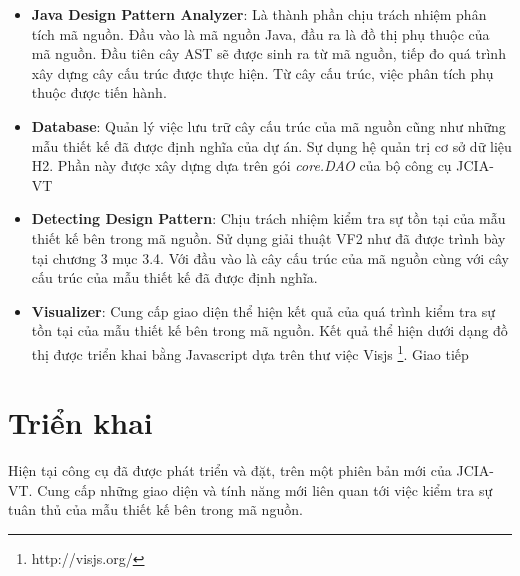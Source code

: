 \documentclass[12pt]{report}
\begin{document}
\begin{itemize}
	\item \noindent \textbf{Java Design Pattern Analyzer}: Là thành phần chịu trách nhiệm phân tích mã nguồn. Đầu vào là mã nguồn Java, đầu ra là đồ thị phụ thuộc của mã nguồn. Đầu tiên cây AST sẽ được sinh ra từ mã nguồn, tiếp đo quá trình xây dựng cây cấu trúc được thực hiện. Từ cây cấu trúc, việc phân tích phụ thuộc được tiến hành.
	\item \noindent \textbf{Database}: Quản lý việc lưu trữ cây cấu trúc của mã nguồn cũng như những mẫu thiết kế đã được định nghĩa của dự án. Sự dụng hệ quản trị cơ sở dữ liệu H2. Phần này được xây dựng dựa trên gói \textit{core.DAO} của bộ công cụ JCIA-VT
	\item \noindent \textbf{Detecting Design Pattern}: Chịu trách nhiệm kiểm tra sự tồn tại của mẫu thiết kế bên trong mã nguồn. Sử dụng giải thuật VF2 như đã được trình bày tại chương 3 mục 3.4. Với đầu vào là cây cấu trúc của mã nguồn cùng với cây cấu trúc của mẫu thiết kế đã được định nghĩa.
	\item \noindent \textbf{Visualizer}: Cung cấp giao diện thể hiện kết quả của quá trình kiểm tra sự tồn tại của mẫu thiết kế bên trong mã nguồn. Kết quả thể hiện dưới dạng đồ thị được triển khai bằng Javascript dựa trên thư việc Visjs \footnote{http://visjs.org/}. Giao tiếp
\end{itemize}
\newpage
\section{Triển khai}
Hiện tại công cụ đã được phát triển và đặt, trên một phiên bản mới của JCIA-VT. Cung cấp những giao diện và tính năng mới liên quan tới việc kiểm tra sự tuân thủ của mẫu thiết kế bên trong mã nguồn.
\end{document}
